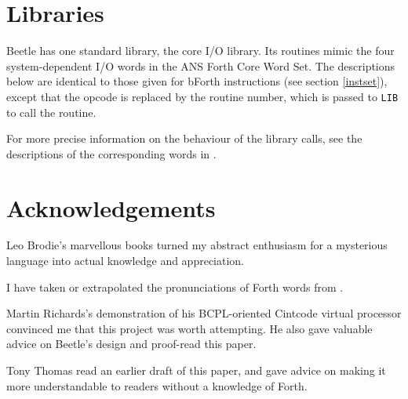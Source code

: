 \section{Libraries}
\label{libraries}

Beetle has one standard library, the core I/O library. Its routines mimic the
four system-dependent I/O words in the ANS Forth Core Word Set. The descriptions
below are identical to those given for bForth instructions (see section
\ref{instset}), except that the opcode is replaced by the routine number, which
is passed to {\tt LIB} to call the routine.

\begin{description}
\end{description}

For more precise information on the behaviour of the library calls, see the
descriptions of the corresponding words in \cite[chapter 6]{ANSIforth}.


\section*{Acknowledgements}

Leo Brodie's marvellous books \cite{starting4th,thinking4th} turned my abstract
enthusiasm for a mysterious language into actual knowledge and appreciation.

I have taken or extrapolated the pronunciations of Forth words from \cite{ANSIforth}.

Martin Richards's demonstration of his BCPL-oriented Cintcode virtual processor
convinced me that this project was worth attempting. He also gave valuable
advice on Beetle's design and proof-read this paper.

Tony Thomas read an earlier draft of this paper, and gave advice on making it
more understandable to readers without a knowledge of Forth.
